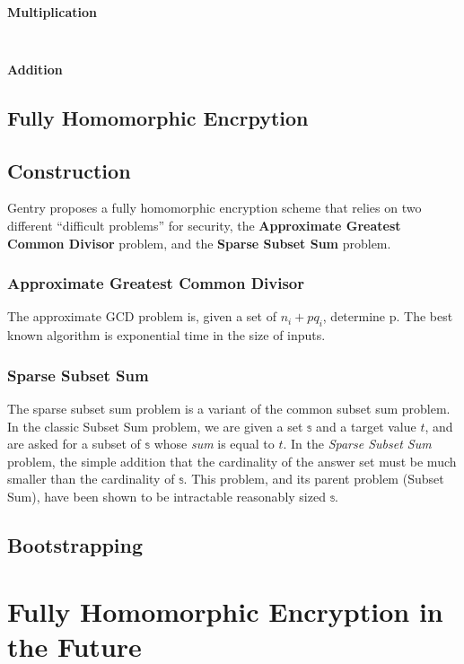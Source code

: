 \documentclass[a4paper,10pt]{article}
\begin{document}
\paragraph{Multiplication}
\begin{eqnarray*}
\end{eqnarray*}

\paragraph{Addition}

\subsection{Fully Homomorphic Encrpytion}

\subsection{Construction}
Gentry proposes a fully homomorphic encryption scheme that relies on
two different ``difficult problems'' for security, the
\textbf{Approximate Greatest Common Divisor} problem, and the
\textbf{Sparse Subset Sum} problem.

\subsubsection{Approximate Greatest Common Divisor}
The approximate GCD problem is, given a set of $ n _{i} + pq_{i} $,
determine p. The best known algorithm is exponential time in the size
of inputs.


\subsubsection{Sparse Subset Sum}
The sparse subset sum problem is a variant of the common subset sum
problem. In the classic Subset Sum problem, we are given a set $
\mathbb{s} $ and a target value $t$, and are asked for a subset of $
\mathbb{s} $ whose \textit{sum} is equal to $t$. In the \textit{Sparse
  Subset Sum} problem, the simple addition that the cardinality of the
answer set must be much smaller than the cardinality of $ \mathbb{s}
$. This problem, and its parent problem (Subset Sum), have been shown
to be intractable reasonably sized $ \mathbb{s} $.

\subsection{Bootstrapping}

\section{Fully Homomorphic Encryption in the Future}

\pagebreak

\end{document}
